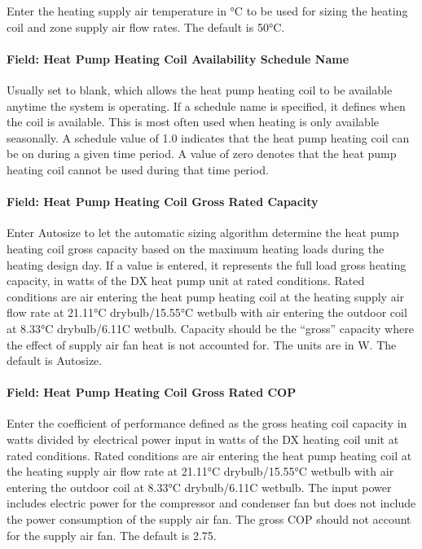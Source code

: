 Enter the heating supply air temperature in °C to be used for sizing the heating coil and zone supply air flow rates. The default is 50°C.

\paragraph{Field: Heat Pump Heating Coil Availability Schedule Name}\label{field-heat-pump-heating-coil-availability-schedule-name-2}

Usually set to blank, which allows the heat pump heating coil to be available anytime the system is operating. If a schedule name is specified, it defines when the coil is available. This is most often used when heating is only available seasonally. A schedule value of 1.0 indicates that the heat pump heating coil can be on during a given time period. A value of zero denotes that the heat pump heating coil cannot be used during that time period.

\paragraph{Field: Heat Pump Heating Coil Gross Rated Capacity}\label{field-heat-pump-heating-coil-gross-rated-capacity-3}

Enter Autosize to let the automatic sizing algorithm determine the heat pump heating coil gross capacity based on the maximum heating loads during the heating design day. If a value is entered, it represents the full load gross heating capacity, in watts of the DX heat pump unit at rated conditions. Rated conditions are air entering the heat pump heating coil at the heating supply air flow rate at 21.11°C drybulb/15.55°C wetbulb with air entering the outdoor coil at 8.33°C drybulb/6.11C wetbulb. Capacity should be the ``gross'' capacity where the effect of supply air fan heat is not accounted for. The units are in W. The default is Autosize.

\paragraph{Field: Heat Pump Heating Coil Gross Rated COP}\label{field-heat-pump-heating-coil-gross-rated-cop-2}

Enter the coefficient of performance defined as the gross heating coil capacity in watts divided by electrical power input in watts of the DX heating coil unit at rated conditions. Rated conditions are air entering the heat pump heating coil at the heating supply air flow rate at 21.11°C drybulb/15.55°C wetbulb with air entering the outdoor coil at 8.33°C drybulb/6.11C wetbulb. The input power includes electric power for the compressor and condenser fan but does not include the power consumption of the supply air fan. The gross COP should not account for the supply air fan. The default is 2.75.

